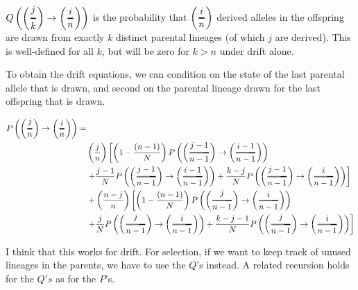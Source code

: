 \documentclass[]{article}
\newcommand{\Dfrac}[2]{%
  \ooalign{%
    $\left(\genfrac{}{}{1.2pt}0{#1}{#2}\right)$\cr%
    $\color{white}\genfrac{}{}{.4pt}0{\phantom{#1}}{\phantom{#2}}$}%
}
\begin{document}
$Q\left(\Dfrac{j}{k} \rightarrow \Dfrac{i}{n} \right)$ is the probability that $\Dfrac{i}{n}$ derived alleles in the offspring are drawn from exactly $k$ distinct parental lineages (of which $j$ are derived). This is well-defined for all $k$, but will be zero for $k>n$ under drift alone. 

To obtain the drift equations, we can condition on the state of the last parental allele that is drawn, and second on the parental lineage drawn for the last offspring that is drawn. 

\begin{equation}
\begin{split}
 P\left(\Dfrac{j}{n} \rightarrow \Dfrac{i}{n} \right) =&\\& \left(\frac{j}{n}\right)\left[ \left(1-\frac{(n-1)}{N}\right) P\left(\Dfrac{j-1}{n-1} \rightarrow \Dfrac{i-1}{n-1} \right) \right. \\&
 \left.+ \frac{j-1}{N} P\left(\Dfrac{j-1}{n-1} \rightarrow \Dfrac{i-1}{n-1} \right)  +     \frac{k-j}{N} P\left(\Dfrac{j-1}{n-1} \rightarrow \Dfrac{i}{n-1} \right)     \right]
 \\&
 + \left(\frac{n-j}{n}\right)\left[ \left(1-\frac{(n-1)}{N}\right) P\left(\Dfrac{j}{n-1} \rightarrow \Dfrac{i}{n-1} \right) 
 \right. \\&
 \left.+ \frac{j}{N} P\left(\Dfrac{j}{n-1} \rightarrow \Dfrac{i}{n-1} \right) +     \frac{k-j-1}{N} P\left(\Dfrac{j}{n-1} \rightarrow \Dfrac{i}{n-1} \right)     \right]
\end{split}
\end{equation}

I think that this works for drift. For selection, if we want to keep track of unused lineages in the parents, we have to use the $Q$'s instead. A related recursion holds for the $Q's$ as for the $P$'s.




 
\end{document}
